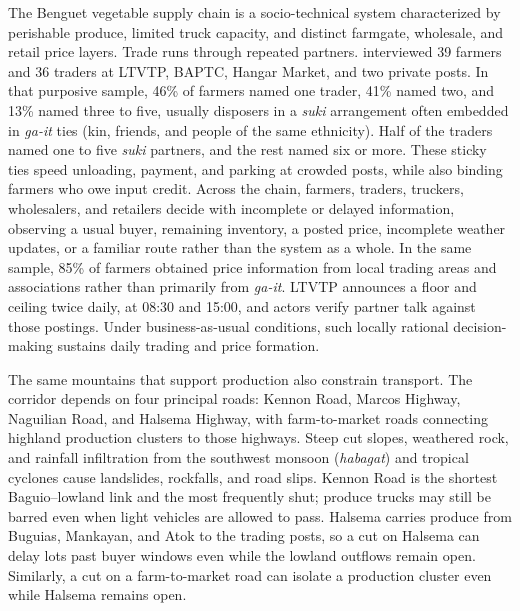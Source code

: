 \documentclass{icsthesis}
\begin{document}
\begin{mainmatter}
			The Benguet vegetable supply chain is a socio-technical system characterized by perishable produce, limited truck capacity, and distinct farmgate, wholesale, and retail price layers. Trade runs through repeated partners. \citet{deGuzmanBambicoBaconguis2023} interviewed 39 farmers and 36 traders at LTVTP, BAPTC, Hangar Market, and two private posts. In that purposive sample, 46\% of farmers named one trader, 41\% named two, and 13\% named three to five, usually disposers in a \emph{suki} arrangement often embedded in \emph{ga-it} ties (kin, friends, and people of the same ethnicity). Half of the traders named one to five \emph{suki} partners, and the rest named six or more. These sticky ties speed unloading, payment, and parking at crowded posts, while also binding farmers who owe input credit. Across the chain, farmers, traders, truckers, wholesalers, and retailers decide with incomplete or delayed information, observing a usual buyer, remaining inventory, a posted price, incomplete weather updates, or a familiar route rather than the system as a whole. In the same sample, 85\% of farmers obtained price information from local trading areas and associations rather than primarily from \emph{ga-it}. LTVTP announces a floor and ceiling twice daily, at 08:30 and 15:00, and actors verify partner talk against those postings. Under business-as-usual conditions, such locally rational decision-making sustains daily trading and price formation.

			The same mountains that support production also constrain transport. The corridor depends on four principal roads: Kennon Road, Marcos Highway, Naguilian Road, and Halsema Highway, with farm-to-market roads connecting highland production clusters to those highways. Steep cut slopes, weathered rock, and rainfall infiltration from the southwest monsoon (\emph{habagat}) and tropical cyclones cause landslides, rockfalls, and road slips. Kennon Road is the shortest Baguio--lowland link and the most frequently shut; produce trucks may still be barred even when light vehicles are allowed to pass. Halsema carries produce from Buguias, Mankayan, and Atok to the trading posts, so a cut on Halsema can delay lots past buyer windows even while the lowland outflows remain open. Similarly, a cut on a farm-to-market road can isolate a production cluster even while Halsema remains open.


\end{mainmatter}
\end{document}
